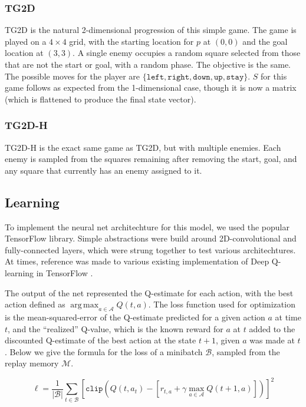 \documentclass[12pt]{article}
\DeclareMathOperator*{\argmax}{arg\,max}
\begin{document}
\subsubsection{TG2D}

TG2D is the natural 2-dimensional progression of this simple game. The game is played on a $4 \times 4$ grid, with the starting location for $p$ at $(0, 0)$ and the goal location at $(3, 3)$. A single enemy occupies a random square selected from those that are not the start or goal, with a random phase. The objective is the same.  The possible moves for the player are $\{\texttt{left}, \texttt{right}, \texttt{down}, \texttt{up}, \texttt{stay}\}$. $S$ for this game follows as expected from the 1-dimensional case, though it is now a matrix (which is flattened to produce the final state vector).

\subsubsection{TG2D-H}

TG2D-H is the exact same game as TG2D, but with multiple enemies. Each enemy is sampled from the squares remaining after removing the start, goal, and any square that currently has an enemy assigned to it.

\subsection{Learning}

To implement the neural net architechture for this model, we used the popular TensorFlow library. Simple abstractions were build around 2D-convolutional and fully-connected layers, which were strung together to test various architechtures. At times, reference was made to various existing implementation of Deep Q-learning in TensorFlow \cite{deep-rl-tensorflow} \cite{dqn-tensorflow}.

The output of the net represented the Q-estimate for each action, with the best action defined as $\argmax_{a \in \mathcal{A}} Q(t, a)$. The loss function used for optimization is the mean-squared-error of the Q-estimate predicted for a given action $a$ at time $t$, and the ``realized'' Q-value, which is the known reward for $a$ at $t$ added to the discounted Q-estimate of the best action at the state $t+1$, given $a$ was made at $t$. Below we give the formula for the loss of a minibatch $\mathcal{B}$, sampled from the replay memory $\mathcal{M}$.

\[\ell = \frac{1}{|\mathcal{B}|} \sum_{t \in \mathcal{B}} \left[\texttt{clip}\left(Q\left(t, a_t\right) - \left[r_{t,a}  + \gamma \max_{a \in \mathcal{A}} Q\left(t+1, a\right)\right]\right)\right]^2\]
\end{document}
